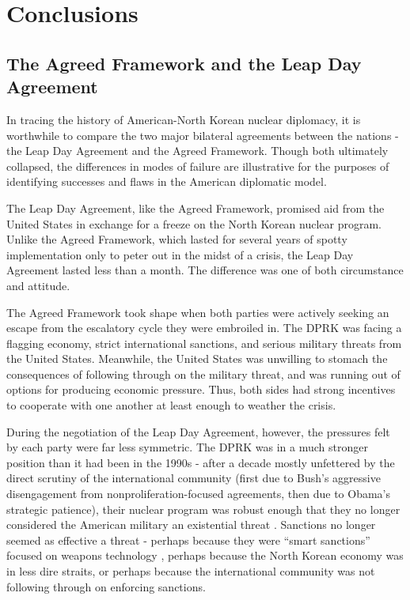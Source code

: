 \chapter{Conclusions}

\section{The Agreed Framework and the Leap Day Agreement}

In tracing the history of American-North Korean nuclear diplomacy, it is worthwhile to compare the two major bilateral agreements between the nations - the Leap Day Agreement and the Agreed Framework. Though both ultimately collapsed, the differences in modes of failure are illustrative for the purposes of identifying successes and flaws in the American diplomatic model.

The Leap Day Agreement, like the Agreed Framework, promised aid from the United States in exchange for a freeze on the North Korean nuclear program. Unlike the Agreed Framework, which lasted for several years of spotty implementation only to peter out in the midst of a crisis, the Leap Day Agreement lasted less than a month. The difference was one of both circumstance and attitude.

The Agreed Framework took shape when both parties were actively seeking an escape from the escalatory cycle they were embroiled in. The DPRK was facing a flagging economy, strict international sanctions, and serious military threats from the United States. Meanwhile, the United States was unwilling to stomach the consequences of following through on the military threat, and was running out of options for producing economic pressure. Thus, both sides had strong incentives to cooperate with one another at least enough to weather the crisis.

During the negotiation of the Leap Day Agreement, however, the pressures felt by each party were far less symmetric. The DPRK was in a much stronger position than it had been in the 1990s - after a decade mostly unfettered by the direct scrutiny of the international community (first due to Bush's aggressive disengagement from nonproliferation-focused agreements, then due to Obama's strategic patience), their nuclear program was robust enough that they no longer considered the American military an existential threat \cite{harnisch,hecker2}. Sanctions no longer seemed as effective a threat - perhaps because they were ``smart sanctions'' focused on weapons technology \cite{delury}, perhaps because the North Korean economy was in less dire straits, or perhaps because the international community was not following through on enforcing sanctions\cite{perlez}.

